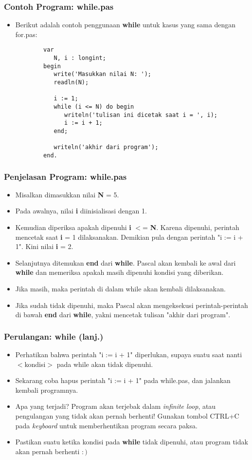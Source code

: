 \documentclass{beamer}
\begin{document}
\begin{frame}[fragile]
\frametitle{Contoh Program: while.pas}
\begin{itemize}
	\item Berikut adalah contoh penggunaan \textbf{while} untuk kasus yang sama dengan for.pas:
	\begin{lstlisting}
		var
		   N, i : longint;
		begin
		   write('Masukkan nilai N: ');
		   readln(N);
		
		   i := 1;
		   while (i <= N) do begin
		      writeln('tulisan ini dicetak saat i = ', i);
		      i := i + 1;
		   end;
		
		   writeln('akhir dari program');
		end.
	\end{lstlisting}
\end{itemize}
\end{frame}

\begin{frame}
\frametitle{Penjelasan Program: while.pas}
\begin{itemize}
	\item Misalkan dimasukkan nilai \textbf{N} = 5.
	\item Pada awalnya, nilai \textbf{i} diinisialisasi dengan 1.
	\item Kemudian diperiksa apakah dipenuhi \textbf{i} $<$= \textbf{N}. Karena dipenuhi, perintah mencetak saat \textbf{i} = 1 dilaksanakan. Demikian pula dengan perintah "i := i + 1". Kini nilai \textbf{i} = 2.
	\item Selanjutnya ditemukan \textbf{end} dari \textbf{while}. Pascal akan kembali ke awal dari \textbf{while} dan memeriksa apakah masih dipenuhi kondisi yang diberikan.
	\item Jika masih, maka perintah di dalam while akan kembali dilaksanakan.
	\item Jika sudah tidak dipenuhi, maka Pascal akan mengeksekusi perintah-perintah di bawah \textbf{end} dari \textbf{while}, yakni mencetak tulisan "akhir dari program".
\end{itemize}
\end{frame}

\begin{frame}
\frametitle{Perulangan: while (lanj.)}
\begin{itemize}
	\item Perhatikan bahwa perintah "i := i + 1" diperlukan, supaya suatu saat nanti $<$kondisi$>$ pada while akan tidak dipenuhi.
	\item Sekarang coba hapus perintah "i := i + 1" pada while.pas, dan jalankan kembali programnya.
	\item Apa yang terjadi? Program akan terjebak dalam \alert{\textit{infinite loop}}, atau \alert{pengulangan yang tidak akan pernah berhenti}! Gunakan tombol CTRL+C pada \textit{keyboard} untuk memberhentikan program secara paksa.
	\item Pastikan suatu ketika kondisi pada \textbf{while} tidak dipenuhi, atau program tidak akan pernah berhenti $:)$
\end{itemize}
\end{frame}
\end{document}
